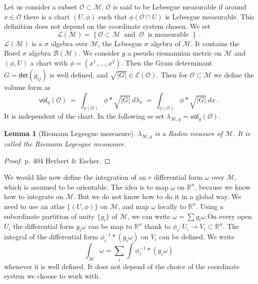 \documentclass[10pt]{book}
\newcommand{\vol}{\mathsf{vol}}
\newcommand{\abs}[1]{\left|#1\right|}
\renewcommand{\det}{\mathsf{det}}
\newcommand{\Bcal}{\mathcal{B}}
\newcommand{\Ecal}{\mathcal{E}}
\newcommand{\Lcal}{\mathcal{L}}
\newcommand{\Mcal}{\mathcal{M}}
\newcommand{\Ocal}{\mathcal{O}}
\newcommand{\Rbb}{\mathbb{R}}
\theoremstyle{break}
\newtheorem{lemma}{Lemma}
\begin{document}
Let us consider a subset $\Ocal \subset \Mcal$. $\Ocal$ is said to be Lebesgue measurable if around $x \in \Ocal$ there is a chart $(U,\phi)$ such that $\phi(\Ocal \cap U)$ is Lebesgue measurable. This definition does not depend on the coordinate system chosen. We set
%
\begin{equation*}
\Lcal(\Mcal) = \left\{ \Ocal \subset \Mcal \ \mbox{ and } \ \Ocal \ \mbox{ is measurable } \right\} \ .
\end{equation*}
%
$\Lcal(\Mcal)$ is a $\sigma$ algebra over $\Mcal$, the Lebesgue $\sigma$ algebra of $\Mcal$. It contains the Borel $\sigma$ algebra $\Bcal(\Mcal)$. We consider $g$ a pseudo riemannian metric on $\Mcal$ and $(\phi,U)$ a chart with $\phi = (x^1, \dots , x^2)$. Then the Gram determinant $G = \det\left(g_{ij}\right)$ is well defined, and $\sqrt{\abs{G}} \in \Ecal(\Ocal)$. Then for $\Ocal \subset \Mcal$ we define the volume form as
%
\begin{equation}
\vol_g(\Ocal) \ = \ \int_{\phi(\Ocal)} \phi \ast \sqrt{\abs{G}} \ d\lambda_n \ = \ \int_{\phi(\Ocal)} \phi \ast \sqrt{\abs{G}} \ dx \ . 
\end{equation}
%
It is independent of the chart. In the following se set $\lambda_{\Mcal,g} = \vol_g(\Ocal)$.
%
\begin{lemma}[Riemann Legesgue meseasure]
$\lambda_{\Mcal,g}$ is a Radon measure of $\Mcal$. It is called the Riemann Legesgue meseasure.
\end{lemma}
%
\begin{proof}
p. 404 Herbert $\&$ Escher.
\end{proof}


\bigskip


We would like now define the integration of an $r$ differential form $\omega$ over $\Mcal$, which is assumed to be orientable. The idea is to map $\omega$ on $\Rbb^n$, because we know how to integrate on $\Mcal$. But we do not know how to do it in a global way. We need to use an atlas $\{(U,\phi)\}$ on $\Mcal$, and map $\omega$ locally to $\Rbb^n$. Using a subordinate partition of unity $\{g_i\}$ of $\Mcal$, we can write $\omega = \sum g_i \omega$.On every open $U_i$ the differential form $g_i \omega$ can be map to $\Rbb^n$ thank to $\phi_i : U_i \to V_i \subset \Rbb^n$. The integral of the differential form $\phi_i^{-1} \ast (g_i \omega)$ on $V_i$ can be defined. We write
%
\begin{equation*}
\int_\Mcal \omega = \sum_i \int_{} \phi_i^{-1} \ast (g_i \omega)
\end{equation*}
%
whenever ii is well defined. It does not depend of the choice of the coordinate system we choose to work with.
\end{document}

